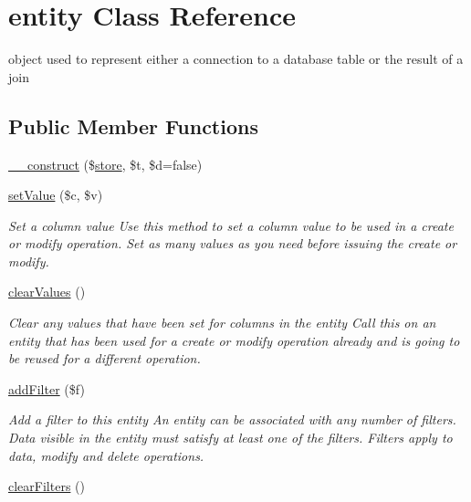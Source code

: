 \hypertarget{classentity}{\section{entity Class Reference}
\label{classentity}
}


object used to represent either a connection to a database table or the result of a join  


\subsection*{Public Member Functions}
\begin{DoxyCompactItemize}
\item 
\hyperlink{classentity_a2411a96bf911703bf07e8bac90ffa7f7}{\-\_\-\-\_\-construct} (\$\hyperlink{classstore}{store}, \$t, \$d=false)
\item 
\hyperlink{classentity_a11cae02dda3cc8b9ad4966e33ef11a2a}{set\-Value} (\$c, \$v)
\begin{DoxyCompactList}\small\item\em Set a column value Use this method to set a column value to be used in a create or modify operation. Set as many values as you need before issuing the create or modify. \end{DoxyCompactList}\item 
\hypertarget{classentity_a7afa5fa5ccc2f9b9a0390cad59ecfede}{\hyperlink{classentity_a7afa5fa5ccc2f9b9a0390cad59ecfede}{clear\-Values} ()}\label{classentity_a7afa5fa5ccc2f9b9a0390cad59ecfede}

\begin{DoxyCompactList}\small\item\em Clear any values that have been set for columns in the entity Call this on an entity that has been used for a create or modify operation already and is going to be reused for a different operation. \end{DoxyCompactList}\item 
\hyperlink{classentity_a7041812e724f4d4e92f7350ac1ca4730}{add\-Filter} (\$f)
\begin{DoxyCompactList}\small\item\em Add a filter to this entity An entity can be associated with any number of filters. Data visible in the entity must satisfy at least one of the filters. Filters apply to data, modify and delete operations. \end{DoxyCompactList}\item 
\hypertarget{classentity_a3c82e6e7a3a2c79306206db541d2a343}{\hyperlink{classentity_a3c82e6e7a3a2c79306206db541d2a343}{clear\-Filters} ()}\label{classentity_a3c82e6e7a3a2c79306206db541d2a343}


\end{DoxyCompactItemize}
